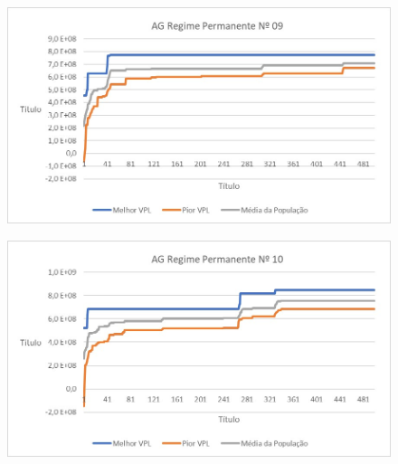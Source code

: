 \documentclass[12pt,a4paper]{report}
\begin{document}
\begin{figure}[H]
\centering

\includegraphics[scale=1]{AGRP/9}

\end{figure}

\begin{figure}[H]
\centering

\includegraphics[scale=1]{AGRP/10}

\end{figure}
\end{document}
